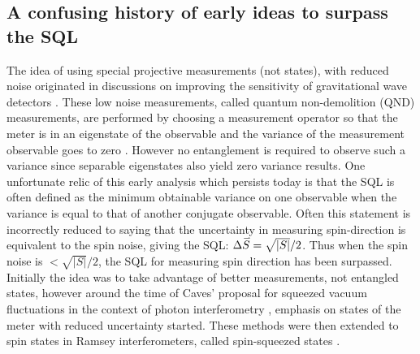 \documentclass[reqno]{amsart}
\newcommand{\myvec}[1]{\accentset{\rightharpoonup}{#1}}
\begin{document}
\subsection{A confusing history of early ideas to surpass the SQL}\label{App:History}
The idea of using special projective measurements (not states), with reduced noise originated in discussions on improving the sensitivity of gravitational wave detectors \cite{Braginsky1974, Braginsky1977, Unruh1979, Braginsky1996}. These low noise measurements, called quantum non-demolition (QND) measurements, are performed by choosing a measurement operator so that the meter is in an eigenstate of the observable and the variance of the measurement observable goes to zero \cite{Unruh1978, Braginsky1980}. However no entanglement is required to observe such a variance since separable eigenstates also yield zero variance results. One unfortunate relic of this early analysis which persists today is that the SQL is often defined as the minimum obtainable variance on one observable when the variance is equal to that of another conjugate observable. Often this statement is incorrectly reduced to saying that the uncertainty in measuring spin-direction is equivalent to the spin noise, giving the SQL: $\Delta \myvec{S} = \sqrt{|S|}/2$. Thus when the spin noise is $< \sqrt{|S|}/2$, the SQL for measuring spin direction has been surpassed. Initially the idea was to take advantage of better measurements, not entangled states, however around the time of Caves' proposal for squeezed vacuum fluctuations in the context of photon interferometry \cite{Caves1981}, emphasis on states of the meter with reduced uncertainty started. These methods were then extended to spin states in Ramsey interferometers, called spin-squeezed states \cite{Kitagawa1991, Wineland1992, Kitagawa1993}. 
\end{document}
